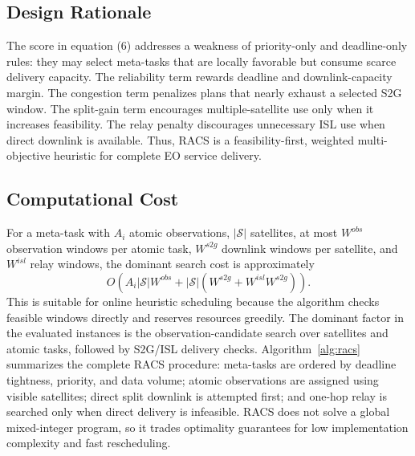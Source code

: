 \documentclass[conference]{IEEEtran}
\begin{document}
\subsection{Design Rationale}
The score in equation (6) addresses a weakness of priority-only and deadline-only rules: they may select meta-tasks that are locally favorable but consume scarce delivery capacity. The reliability term rewards deadline and downlink-capacity margin. The congestion term penalizes plans that nearly exhaust a selected S2G window. The split-gain term encourages multiple-satellite use only when it increases feasibility. The relay penalty discourages unnecessary ISL use when direct downlink is available. Thus, RACS is a feasibility-first, weighted multi-objective heuristic for complete EO service delivery.

\subsection{Computational Cost}
For a meta-task with $A_i$ atomic observations, $|\mathcal{S}|$ satellites, at most $W^{obs}$ observation windows per atomic task, $W^{s2g}$ downlink windows per satellite, and $W^{isl}$ relay windows, the dominant search cost is approximately
\begin{equation}
O(A_i|\mathcal{S}|W^{obs}+|\mathcal{S}|(W^{s2g}+W^{isl}W^{s2g})).
\end{equation}
This is suitable for online heuristic scheduling because the algorithm checks feasible windows directly and reserves resources greedily. The dominant factor in the evaluated instances is the observation-candidate search over satellites and atomic tasks, followed by S2G/ISL delivery checks. Algorithm~\ref{alg:racs} summarizes the complete RACS procedure: meta-tasks are ordered by deadline tightness, priority, and data volume; atomic observations are assigned using visible satellites; direct split downlink is attempted first; and one-hop relay is searched only when direct delivery is infeasible. RACS does not solve a global mixed-integer program, so it trades optimality guarantees for low implementation complexity and fast rescheduling.
\end{document}
